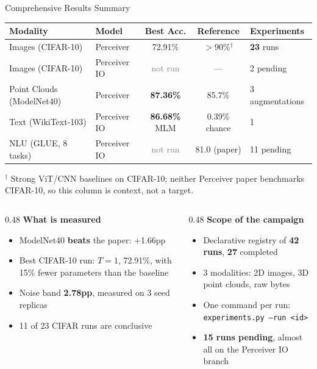 \documentclass[aspectratio=169,11pt]{beamer}
\begin{document}
\begin{frame}[shrink=5]{Comprehensive Results Summary}
  \begin{table}
    \centering\small
    \begin{tabular}{llccl}
      \toprule
      \textbf{Modality} & \textbf{Model} & \textbf{Best Acc.} & \textbf{Reference} & \textbf{Experiments} \\
      \midrule
      Images (CIFAR-10) & Perceiver & 72.91\% & $>$90\%$^{\dagger}$ & \textbf{23} runs \\
      Images (CIFAR-10) & Perceiver IO & \textcolor{gray}{not run} & --- & 2 pending \\
      Point Clouds (ModelNet40) & Perceiver & \textbf{87.36\%} & 85.7\% & 3 augmentations \\
      Text (WikiText-103) & Perceiver IO & \textbf{86.68\%} MLM & 0.39\% chance & 1 \\
      NLU (GLUE, 8 tasks) & Perceiver IO & \textcolor{gray}{not run} & 81.0 (paper) & 11 pending \\
      \bottomrule
    \end{tabular}
  \end{table}

  {\scriptsize $^{\dagger}$ Strong ViT/CNN baselines on CIFAR-10; neither Perceiver paper benchmarks CIFAR-10, so this column is context, not a target.}

  \vspace{0.4em}
  \begin{columns}[T]
    \begin{column}{0.48\textwidth}
      \textbf{What is measured}
      \begin{itemize}\small
        \item ModelNet40 \textbf{beats} the paper: $+$1.66pp
        \item Best CIFAR-10 run: $T{=}1$, 72.91\%, with 15\% fewer parameters than the baseline
        \item Noise band \textbf{2.78pp}, measured on 3 seed replicas
        \item 11 of 23 CIFAR runs are conclusive
      \end{itemize}
    \end{column}
    \begin{column}{0.48\textwidth}
      \textbf{Scope of the campaign}
      \begin{itemize}\small
        \item Declarative registry of \textbf{42 runs}, \textbf{27} completed
        \item 3 modalities: 2D images, 3D point clouds, raw bytes
        \item One command per run: \texttt{experiments.py --run <id>}
        \item \textbf{15 runs pending}, almost all on the Perceiver IO branch
      \end{itemize}
    \end{column}
  \end{columns}
\end{frame}
\end{document}
